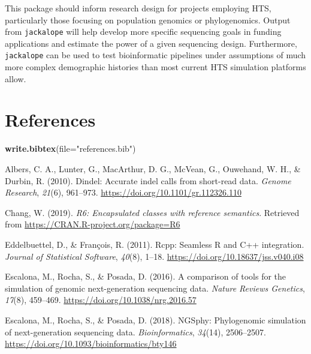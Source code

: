 \documentclass[12pt,]{article}
\newenvironment{Shaded}{\begin{snugshade}}{\end{snugshade}}
\newcommand{\DataTypeTok}[1]{\textcolor[rgb]{0.13,0.29,0.53}{#1}}
\newcommand{\KeywordTok}[1]{\textcolor[rgb]{0.13,0.29,0.53}{\textbf{#1}}}
\newcommand{\NormalTok}[1]{#1}
\newcommand{\StringTok}[1]{\textcolor[rgb]{0.31,0.60,0.02}{#1}}
\begin{document}
This package should inform research design for projects employing HTS,
particularly those focusing on population genomics or phylogenomics.
Output from \texttt{jackalope} will help develop more specific sequencing goals
in funding applications and estimate the power of a given sequencing design.
Furthermore, \texttt{jackalope} can be used to test bioinformatic pipelines under assumptions of
much more complex demographic histories than most current HTS simulation
platforms allow.

\hypertarget{references}{%
\section{References}\label{references}}

\begin{Shaded}
\begin{Highlighting}[]
\KeywordTok{write.bibtex}\NormalTok{(}\DataTypeTok{file=}\StringTok{"references.bib"}\NormalTok{)}
\end{Highlighting}
\end{Shaded}

\hypertarget{refs}{}
\leavevmode\hypertarget{ref-Albers_2010}{}%
Albers, C. A., Lunter, G., MacArthur, D. G., McVean, G., Ouwehand, W. H., \& Durbin, R. (2010). Dindel: Accurate indel calls from short-read data. \emph{Genome Research}, \emph{21}(6), 961--973. \url{https://doi.org/10.1101/gr.112326.110}

\leavevmode\hypertarget{ref-Chang_2019}{}%
Chang, W. (2019). \emph{R6: Encapsulated classes with reference semantics}. Retrieved from \url{https://CRAN.R-project.org/package=R6}

\leavevmode\hypertarget{ref-Eddelbuettel_2011}{}%
Eddelbuettel, D., \& François, R. (2011). Rcpp: Seamless R and C++ integration. \emph{Journal of Statistical Software}, \emph{40}(8), 1--18. \url{https://doi.org/10.18637/jss.v040.i08}

\leavevmode\hypertarget{ref-Escalona_2016}{}%
Escalona, M., Rocha, S., \& Posada, D. (2016). A comparison of tools for the simulation of genomic next-generation sequencing data. \emph{Nature Reviews Genetics}, \emph{17}(8), 459--469. \url{https://doi.org/10.1038/nrg.2016.57}

\leavevmode\hypertarget{ref-Escalona_2018}{}%
Escalona, M., Rocha, S., \& Posada, D. (2018). NGSphy: Phylogenomic simulation of next-generation sequencing data. \emph{Bioinformatics}, \emph{34}(14), 2506--2507. \url{https://doi.org/10.1093/bioinformatics/bty146}
\end{document}
